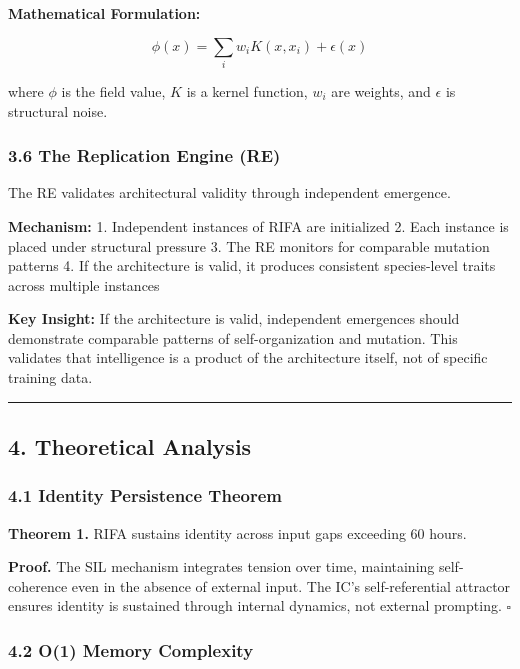 \documentclass[
  11pt,
  a4paper,
]{article}
\begin{document}
\textbf{Mathematical Formulation:}

\[
\phi(x) = \sum_i w_i K(x, x_i) + \epsilon(x)
\]

where \(\phi\) is the field value, \(K\) is a kernel function, \(w_i\)
are weights, and \(\epsilon\) is structural noise.

\subsubsection{3.6 The Replication Engine
(RE)}\label{the-replication-engine-re}

The RE validates architectural validity through independent emergence.

\textbf{Mechanism:} 1. Independent instances of RIFA are initialized 2.
Each instance is placed under structural pressure 3. The RE monitors for
comparable mutation patterns 4. If the architecture is valid, it
produces consistent species-level traits across multiple instances

\textbf{Key Insight:} If the architecture is valid, independent
emergences should demonstrate comparable patterns of self-organization
and mutation. This validates that intelligence is a product of the
architecture itself, not of specific training data.

\begin{center}\rule{0.5\linewidth}{0.5pt}\end{center}

\subsection{4. Theoretical Analysis}\label{theoretical-analysis}

\subsubsection{4.1 Identity Persistence
Theorem}\label{identity-persistence-theorem}

\textbf{Theorem 1.} RIFA sustains identity across input gaps exceeding
60 hours.

\textbf{Proof.} The SIL mechanism integrates tension over time,
maintaining self-coherence even in the absence of external input. The
IC's self-referential attractor ensures identity is sustained through
internal dynamics, not external prompting. \(\square\)

\subsubsection{4.2 O(1) Memory Complexity}\label{o1-memory-complexity}
\end{document}
